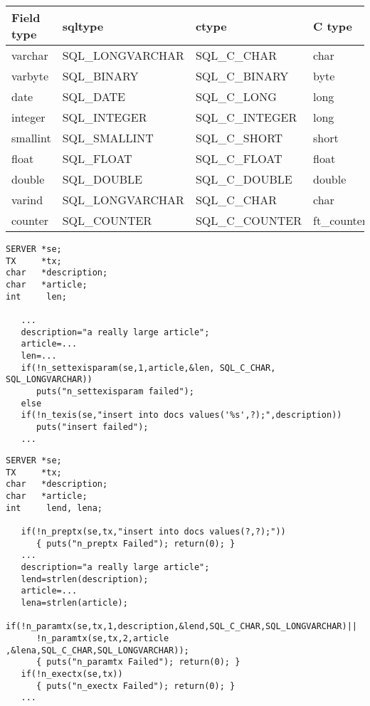 \begin{tabular}{|l|l|l|l|}\hline
Field type & sqltype          & ctype           & C type     \\ \hline
varchar    & SQL\_LONGVARCHAR & SQL\_C\_CHAR    & char       \\
varbyte    & SQL\_BINARY      & SQL\_C\_BINARY  & byte       \\
date       & SQL\_DATE        & SQL\_C\_LONG    & long       \\
integer    & SQL\_INTEGER     & SQL\_C\_INTEGER & long       \\
smallint   & SQL\_SMALLINT    & SQL\_C\_SHORT   & short      \\
float      & SQL\_FLOAT       & SQL\_C\_FLOAT   & float      \\
double     & SQL\_DOUBLE      & SQL\_C\_DOUBLE  & double     \\
varind     & SQL\_LONGVARCHAR & SQL\_C\_CHAR    & char       \\
counter    & SQL\_COUNTER     & SQL\_C\_COUNTER & ft\_counter \\
\hline
\end{tabular}


\EXAMPLE
\begin{verbatim}
SERVER *se;
TX     *tx;
char   *description;
char   *article;
int     len;

   ...
   description="a really large article";
   article=...
   len=...
   if(!n_settexisparam(se,1,article,&len, SQL_C_CHAR, SQL_LONGVARCHAR))
      puts("n_settexisparam failed");
   else
   if(!n_texis(se,"insert into docs values('%s',?);",description))
      puts("insert failed");
   ...
\end{verbatim}

\EXAMPLE
\begin{verbatim}
SERVER *se;
TX     *tx;
char   *description;
char   *article;
int     lend, lena;

   if(!n_preptx(se,tx,"insert into docs values(?,?);"))
      { puts("n_preptx Failed"); return(0); }
   ...
   description="a really large article";
   lend=strlen(description);
   article=...
   lena=strlen(article);
   if(!n_paramtx(se,tx,1,description,&lend,SQL_C_CHAR,SQL_LONGVARCHAR)||
      !n_paramtx(se,tx,2,article    ,&lena,SQL_C_CHAR,SQL_LONGVARCHAR));
      { puts("n_paramtx Failed"); return(0); }
   if(!n_exectx(se,tx))
      { puts("n_exectx Failed"); return(0); }
   ...
\end{verbatim}


